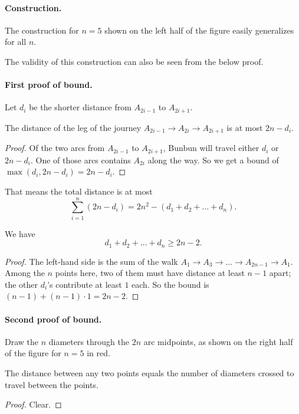 \paragraph{Construction.}
The construction for $n = 5$ shown on the left half of the figure
easily generalizes for all $n$.
\begin{remark*}
  The validity of this construction
  can also be seen from the below proof.
\end{remark*}

\paragraph{First proof of bound.}
Let $d_i$ be the shorter distance from $A_{2i-1}$ to $A_{2i+1}$.
\begin{claim*}
The distance of the leg of the journey $A_{2i-1} \to A_{2i} \to A_{2i+1}$
is at most $2n - d_i$.
\end{claim*}
\begin{proof}
  Of the two arcs from $A_{2i-1}$ to $A_{2i+1}$,
  Bunbun will travel either $d_i$ or $2n-d_i$.
  One of those arcs contains $A_{2i}$ along the way.
  So we get a bound of $\max(d_i, 2n-d_i) = 2n - d_i$.
\end{proof}
That means the total distance is at most
\[ \sum_{i=1}^n \left( 2n - d_i \right)
  = 2n^2 - (d_1 + d_2 + \dots + d_n). \]
\begin{claim*}
  We have \[ d_1 + d_2 + \dots + d_n \ge 2n-2. \]
\end{claim*}
\begin{proof}
  The left-hand side is the sum of the walk
  $A_1 \to A_3 \to \dots \to A_{2n-1} \to A_1$.
  Among the $n$ points here, two of them must have distance at least $n-1$ apart;
  the other $d_i$'s contribute at least $1$ each.
  So the bound is $(n-1) + (n-1) \cdot 1 = 2n-2$.
\end{proof}

\paragraph{Second proof of bound.}
Draw the $n$ diameters through the $2n$ arc midpoints,
as shown on the right half of the figure for $n = 5$ in red.
\begin{claim*}
  The distance between any two points equals the number of diameters crossed to travel between the points.
\end{claim*}
\begin{proof}
    Clear.
\end{proof}

